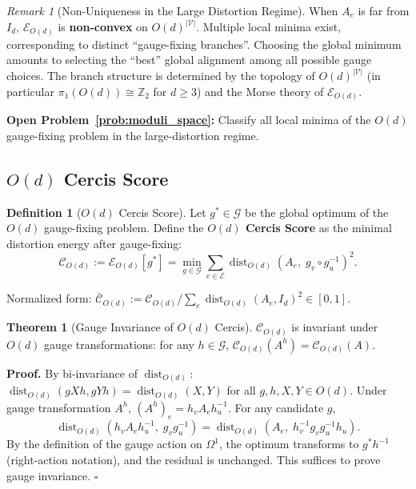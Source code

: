 \documentclass[12pt,a4paper]{article}
\theoremstyle{definition}
\newtheorem{definition}{Definition}[section]
\newtheorem{theorem}{Theorem}[section]
\theoremstyle{remark}
\newtheorem{remark}{Remark}[section]
\theoremstyle{definition}
\newcommand{\Z}{\mathbb{Z}}
\newcommand{\Od}{O(d)}
\newcommand{\verts}{\mathcal{V}}
\newcommand{\edgs}{\mathcal{E}}
\newcommand{\cercis}{\mathcal{C}}
\newcommand{\cercisnorm}{\bar{\mathcal{C}}}
\DeclareMathOperator{\dist}{dist}
\begin{document}
\begin{remark}[Non-Uniqueness in the Large Distortion Regime]
When $A_e$ is far from $I_d$, $\mathcal{E}_{\Od}$ is \textbf{non-convex} on $\Od^{|\verts|}$.
Multiple local minima exist, corresponding to distinct ``gauge-fixing branches''.
Choosing the global minimum amounts to selecting the ``best'' global alignment among all possible gauge choices.
The branch structure is determined by the topology of $\Od^{|\verts|}$ (in particular $\pi_1(\Od) \cong \Z_2$ for $d \geq 3$) and
the Morse theory of $\mathcal{E}_{\Od}$.

\textbf{Open Problem~\ref{prob:moduli_space}:} Classify all local minima of the $O(d)$ gauge-fixing problem in the large-distortion regime.
\end{remark}

\subsection{$O(d)$ Cercis Score}

\begin{definition}[$O(d)$ Cercis Score]\label{def:od_cercis}
Let $g^* \in \mathcal{G}$ be the global optimum of the $O(d)$ gauge-fixing problem.
Define the \textbf{$O(d)$ Cercis Score} as the minimal distortion energy after gauge-fixing:
\[
    \cercis_{\Od} := \mathcal{E}_{\Od}[g^*] = \min_{g \in \mathcal{G}} \sum_{e \in \edgs} \dist_{\Od}(A_e,\; g_v \circ g_u^{-1})^2.
\]

Normalized form: $\cercisnorm_{\Od} := \cercis_{\Od} / \sum_e \dist_{\Od}(A_e, I_d)^2 \in [0, 1]$.
\end{definition}

\begin{theorem}[Gauge Invariance of $O(d)$ Cercis]\label{thm:od_cercis_inv}
$\cercis_{\Od}$ is invariant under $O(d)$ gauge transformations: for any $h \in \mathcal{G}$,
$\cercis_{\Od}(A^h) = \cercis_{\Od}(A)$.

\textbf{Proof.}
By bi-invariance of $\dist_{\Od}$: $\dist_{\Od}(gXh, gYh) = \dist_{\Od}(X, Y)$ for all $g, h, X, Y \in \Od$.
Under gauge transformation $A^h$, $(A^h)_e = h_v A_e h_u^{-1}$.
For any candidate $g$,
\[
    \dist_{\Od}(h_v A_e h_u^{-1},\; g_v g_u^{-1})
    = \dist_{\Od}(A_e,\; h_v^{-1} g_v g_u^{-1} h_u).
\]
By the definition of the gauge action on $\Omega^1$, the optimum transforms to $g^* h^{-1}$ (right-action notation),
and the residual is unchanged. This suffices to prove gauge invariance. $\square$
\end{theorem}
\end{document}
